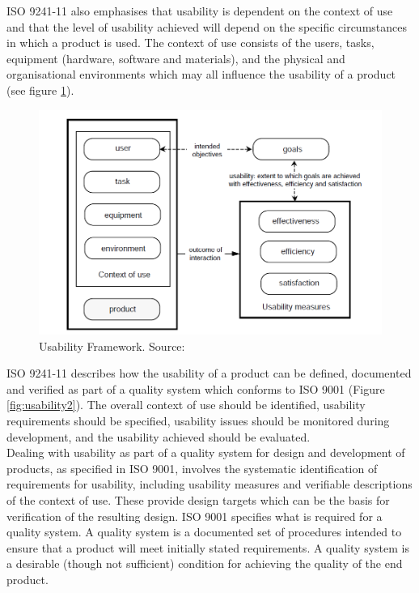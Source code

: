 ISO 9241-11 also emphasises that usability is dependent on the context of use and that the
level of usability achieved will depend on the specific circumstances in which a product is
used. The context of use consists of the users, tasks, equipment (hardware, software and
materials), and the physical and organisational environments which may all influence the
usability of a product (see figure \ref{fig:usability1}).

\begin{figure}[H]
\caption{Usability Framework. Source: \cite{bevan1995human}}
\label{fig:usability1}
\includegraphics[scale=0.285]{img/usability1.png}
\end{figure} 

ISO 9241-11 describes how the usability of a product can be defined, documented and
verified as part of a quality system which conforms to ISO 9001 (Figure \ref{fig:usability2}). The overall context of use should be identified, usability requirements should be specified, usability issues should be monitored during development, and the usability achieved should be evaluated. \\
Dealing with usability as part of a quality system for design and development of products, as specified in ISO 9001, involves the systematic identification of requirements for usability, including usability measures and verifiable descriptions of the context of use. These provide design targets which can be the basis for verification of the resulting design. ISO 9001 specifies what is required for a quality system. A quality system is a documented set of procedures intended to ensure that a product will meet initially stated requirements. A quality system is a desirable (though not sufficient) condition for achieving the quality of the end product. 

